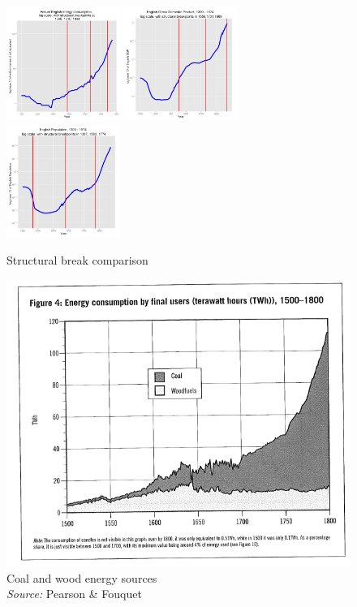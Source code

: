 \documentclass[final]{beamer}
\begin{document}
\begin{frame}
\begin{figure}[p!]
		\caption{Structural break comparison}
		\label{fig:structural}		
		\centerline{
		\mbox{\includegraphics[width=0.33\textwidth]{energyLog1}}
		\mbox{\includegraphics[width=0.33\textwidth]{gbpgdplog}}
		\mbox{\includegraphics[width=0.33\textwidth]{popLog}}
		}
\end{figure}
\end{frame}

\begin{frame}
\begin{figure}[p!]
\center
\caption{Coal and wood energy sources\\\textit{Source:} Pearson \& Fouquet}
\label{fig:woodCoal}
\includegraphics[height=0.8\textheight]{woodCoal.png}
\end{figure}
\end{frame}
\end{document}
